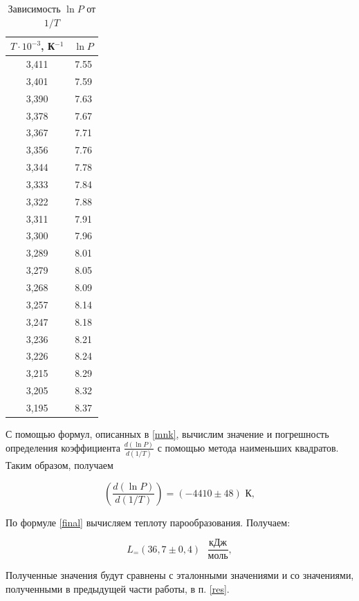 \documentclass[12pt,a4paper]{article}
\begin{document}
\begin{table}[H]
	\centering
	\begin{tabular}{|c|c|}
		\hline
		$ T \cdot 10^{-3} $, К$ ^{-1} $ & $ \ln P $ \\
		\hline
		3,411 & 7.55 \\
		\hline
		3,401 & 7.59 \\
		\hline
		3,390 & 7.63 \\
		\hline
		3,378 & 7.67 \\
		\hline
		3,367 & 7.71 \\
		\hline
		3,356 & 7.76 \\
		\hline
		3,344 & 7.78 \\
		\hline
		3,333 & 7.84 \\
		\hline
		3,322 & 7.88 \\
		\hline
		3,311 & 7.91 \\
		\hline
		3,300 & 7.96 \\
		\hline
		3,289 & 8.01 \\
		\hline
		3,279 & 8.05 \\
		\hline
		3,268 & 8.09 \\
		\hline
		3,257 & 8.14 \\
		\hline
		3,247 & 8.18 \\
		\hline
		3,236 & 8.21 \\
		\hline
		3,226 & 8.24 \\
		\hline
		3,215 & 8.29 \\
		\hline
		3,205 & 8.32 \\
		\hline
		3,195 & 8.37 \\
		\hline
	\end{tabular}
	\caption{Зависимость $\ln P$ от $1/T$}
	\label{tab:ln}
\end{table}

С помощью формул, описанных в \ref{mnk}, вычислим значение и погрешность определения коэффициента $ \displaystyle \frac{d(\ln P)}{d(1/T)} $ с помощью метода наименьших квадратов. Таким образом, получаем

\[ \left(\frac{d(\ln P)}{d(1/T)}\right) = \left(-4410\pm48\right)\text{ К}, \]


По формуле \eqref{final} вычисляем теплоту парообразования. Получаем:

\[ L_ = \left(36,7 \pm 0,4\right) \text{ } \frac{\text{кДж}}{\text{моль}}, \]


Полученные значения будут сравнены с эталонными значениями и со значениями, полученными в предыдущей части работы, в п. \ref{res}.
\end{document}
